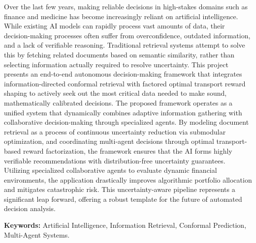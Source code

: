 \documentclass[12pt,a4paper,oneside]{report}
\theoremstyle{definition}
\theoremstyle{remark}
\begin{document}
\vspace{0.5cm}
Over the last few years, making reliable decisions in high-stakes domains such as finance and medicine has become increasingly reliant on artificial intelligence. While existing AI models can rapidly process vast amounts of data, their decision-making processes often suffer from overconfidence, outdated information, and a lack of verifiable reasoning. Traditional retrieval systems attempt to solve this by fetching related documents based on semantic similarity, rather than selecting information actually required to resolve uncertainty. This project presents an end-to-end autonomous decision-making framework that integrates information-directed conformal retrieval with factored optimal transport reward shaping to actively seek out the most critical data needed to make sound, mathematically calibrated decisions. The proposed framework operates as a unified system that dynamically combines adaptive information gathering with collaborative decision-making through specialized agents. By modeling document retrieval as a process of continuous uncertainty reduction via submodular optimization, and coordinating multi-agent decisions through optimal transport-based reward factorization, the framework ensures that the AI forms highly verifiable recommendations with distribution-free uncertainty guarantees. Utilizing specialized collaborative agents to evaluate dynamic financial environments, the application drastically improves algorithmic portfolio allocation and mitigates catastrophic risk. This uncertainty-aware pipeline represents a significant leap forward, offering a robust template for the future of automated decision analysis.

\vspace{0.5cm}
\noindent\textbf{Keywords:} Artificial Intelligence, Information Retrieval, Conformal Prediction, Multi-Agent Systems.

\newpage




\end{document}
